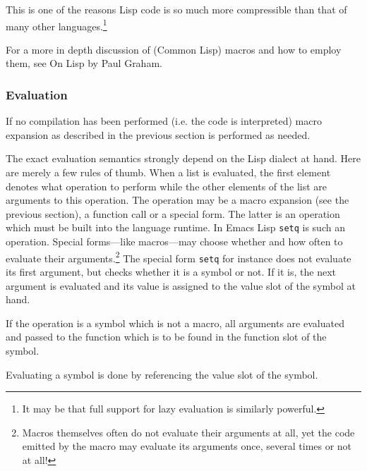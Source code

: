 \documentclass[a4paper,10pt,twoside]{report}
\newcommand{\el}{Emacs Lisp}
\newcommand{\cl}{Common Lisp}
\newcommand{\fun}[1]{\texttt{#1}}
\begin{document}
This is one of the reasons Lisp code is so much more compressible than that of
many other languages.\footnote{It may be that full support for lazy evaluation
  is similarly powerful.}

For a more in depth discussion of (\cl{}) macros and how to employ them, see On
Lisp by Paul Graham.\cite{on-lisp}

\subsubsection{Evaluation}
\label{subsubsec:evaluation}

If no compilation has been performed (i.e. the code is interpreted) macro
expansion as described in the previous section is performed as needed.

The exact evaluation semantics strongly depend on the Lisp dialect at hand.
Here are merely a few rules of thumb.  When a list is evaluated, the first
element denotes what operation to perform while the other elements of the list
are arguments to this operation.  The operation may be a macro expansion (see
the previous section), a function call or a special form.  The latter is an
operation which must be built into the language runtime.  In \el{} \fun{setq} is
such an operation.  Special forms---like macros---may choose whether and how
often to evaluate their arguments.\footnote{Macros themselves often do not
  evaluate their arguments at all, yet the code emitted by the macro may
  evaluate its arguments once, several times or not at all!}  The special form
\fun{setq} for instance does not evaluate its first argument, but checks whether
it is a symbol or not.  If it is, the next argument is evaluated and its value
is assigned to the value slot of the symbol at hand.

If the operation is a symbol which is not a macro, all arguments are evaluated
and passed to the function which is to be found in the function slot of the
symbol.

Evaluating a symbol is done by referencing the value slot of the symbol.


\end{document}
